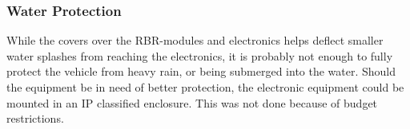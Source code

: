 \subsubsection{Water Protection}
While the covers over the RBR-modules and electronics helps deflect smaller
water splashes from reaching the electronics, it is probably not enough to
fully protect the vehicle from heavy rain, or being submerged into the water.
Should the equipment be in need of better protection, the electronic equipment
could be mounted in an IP classified enclosure. This was not done because of
budget restrictions.

